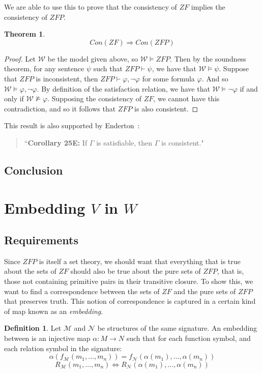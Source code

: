 \documentclass[11pt]{report}
\theoremstyle{definition}
\theoremstyle{theorem}
\theoremstyle{lemma}
\newtheorem{definition}{Definition}[section]
\newtheorem{theorem}{Theorem}[section]
\begin{document}
We are able to use this to prove that the consistency of $\mathit{ZF}$ implies the consistency of $\mathit{ZFP}$. 
\begin{theorem}
$$\mathit{Con(ZF)} \Rightarrow \mathit{Con(ZFP)}$$
\begin{proof}
Let $\mathcal{W}$ be the model given above, so $\mathcal{W} \vDash \mathit{ZFP}$.
Then by the soundness theorem, for any sentence $\psi$ such that $\mathit{ZFP}\vdash \psi$, we have that $\mathcal{W} \vDash \psi$. 
Suppose that $\mathit{ZFP}$ is inconsistent, then $ZFP \vdash \varphi,\neg\varphi$ for some formula $\varphi$. 
And so $\mathcal{W} \vDash \varphi, \neg\varphi$.
By definition of the satisfaction relation, we have that $\mathcal{W} \vDash \neg\varphi$ if and only if $\mathcal{W} \nvDash \varphi$.
Supposing the consistency of $\mathit{ZF}$, we cannot have this contradiction, and so it follows that $\mathit{ZFP}$ is also consistent. 
\end{proof}
\end{theorem}

This result is also supported by Enderton~\cite{enderton}:
\begin{quote}
``\textbf{Corollary 25E:} If $\Gamma$ is satisfiable, then $\Gamma$ is consistent."
\end{quote}
\subsection{Conclusion}

\section{Embedding $V$ in $W$}\label{embedding}
\subsection{Requirements}

Since $\mathit{ZFP}$ is itself a set theory, we should want that everything that is true about the sets of $\mathit{ZF}$ should also be true about the pure sets of $\mathit{ZFP}$, that is, those not containing primitive pairs in their transitive closure. To show this, we want to find a correspondence between the sets of $\mathit{ZF}$ and the pure sets of $\mathit{ZFP}$ that preserves truth. This notion of correspondence is captured in a certain kind of map known as an \emph{embedding}.

\begin{definition}\label{embedding}
Let $\mathcal{M}$ and $\mathcal{N}$ be structures of the same signature. An embedding between is an injective map $\alpha:M\to N$ such that for each function symbol, and each relation symbol in the signature:
 $$\alpha(f_{\mathcal{M}}(m_1,\ldots,m_n)) = f_{\mathcal{N}}(\alpha(m_1),\ldots,\alpha(m_n))$$
 $$R_\mathcal{M}(m_1,\ldots,m_n) \iff R_\mathcal{N}(\alpha(m_1),\ldots,\alpha(m_n))$$
\end{definition}
\end{document}
